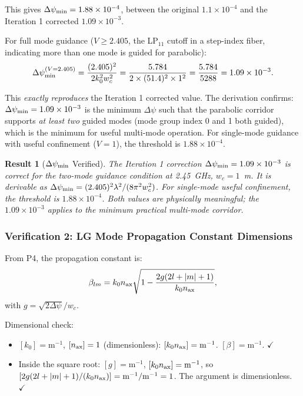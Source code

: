 \documentclass[aps,prd,twocolumn,superscriptaddress,nofootinbib]{revtex4-2}
\newtheorem{result}{Result}
\begin{document}
This gives $\Delta\psi_{\rm min} = 1.88\times10^{-4}$, between the original
$1.1\times10^{-4}$ and the Iteration 1 corrected $1.09\times10^{-3}$.

For full mode guidance ($V \geq 2.405$, the LP$_{11}$ cutoff in a step-index
fiber, indicating more than one mode is guided for parabolic):
\begin{equation}
\Delta\psi_{\rm min}^{(V=2.405)}
= \frac{(2.405)^2}{2k_0^2 w_c^2}
= \frac{5.784}{2\times(51.4)^2\times1^2}
= \frac{5.784}{5288} = 1.09\times10^{-3}.
\end{equation}

This \emph{exactly reproduces} the Iteration 1 corrected value.  The
derivation confirms: $\Delta\psi_{\rm min} = 1.09\times10^{-3}$ is the
minimum $\Delta\psi$ such that the parabolic corridor supports \emph{at
least two} guided modes (mode group index 0 and 1 both guided), which is
the minimum for useful multi-mode operation.  For single-mode guidance
with useful confinement ($V = 1$), the threshold is $1.88\times10^{-4}$.

\begin{result}[$\Delta\psi_{\rm min}$ Verified]
The Iteration 1 correction $\Delta\psi_{\rm min} = 1.09\times10^{-3}$ is
correct for the \emph{two-mode guidance condition} at 2.45~GHz, $w_c = 1$~m.
It is derivable as $\Delta\psi_{\rm min} = (2.405)^2\lambda^2/(8\pi^2 w_c^2)$.
For single-mode useful confinement, the threshold is $1.88\times10^{-4}$.
Both values are physically meaningful; the $1.09\times10^{-3}$ applies to the
minimum practical multi-mode corridor.
\end{result}

\subsubsection{Verification 2: LG Mode Propagation Constant Dimensions}

From P4, the propagation constant is:
\begin{equation}
\beta_{lm} = k_0 n_{\rm ax}\sqrt{1 - \frac{2g(2l+|m|+1)}{k_0 n_{\rm ax}}},
\label{eq:beta-verify}
\end{equation}
with $g = \sqrt{2\Delta\psi}/w_c$.

Dimensional check:
\begin{itemize}
\item $[k_0] = \text{m}^{-1}$, $[n_{\rm ax}] = 1$ (dimensionless):
$[k_0 n_{\rm ax}] = \text{m}^{-1}$.  $[\beta] = \text{m}^{-1}$. $\checkmark$
\item Inside the square root: $[g] = \text{m}^{-1}$,
$[k_0 n_{\rm ax}] = \text{m}^{-1}$,
so $[2g(2l+|m|+1)/(k_0 n_{\rm ax})] = \text{m}^{-1}/\text{m}^{-1} = 1$.
The argument is dimensionless. $\checkmark$
\end{itemize}
\end{document}
